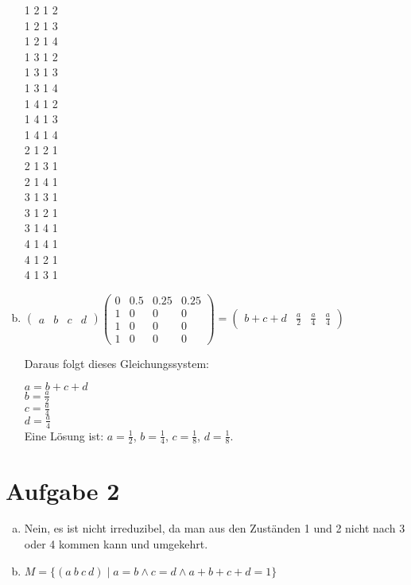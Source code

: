 \documentclass[10pt,a4paper,parskip=half]{scrartcl}
\begin{document}
\begin{enumerate}[a)]
1 2 1 2\\
1 2 1 3\\
1 2 1 4\\
1 3 1 2\\
1 3 1 3\\
1 3 1 4\\
1 4 1 2\\
1 4 1 3\\
1 4 1 4\\
2 1 2 1\\
2 1 3 1\\
2 1 4 1\\
3 1 3 1\\
3 1 2 1\\
3 1 4 1\\
4 1 4 1\\
4 1 2 1\\
4 1 3 1\\
\item
$\begin{pmatrix} a & b & c & d \end{pmatrix}\begin{pmatrix} 0 & 0.5 & 0.25 & 0.25 \\ 1 & 0 & 0 & 0\\ 1 & 0 & 0 & 0\\ 1 & 0 & 0 & 0 \end{pmatrix} = \begin{pmatrix} b + c + d & \frac a 2 & \frac a 4 & \frac a 4 \end{pmatrix}$

Daraus folgt dieses Gleichungssystem:

$a = b + c + d$\\
$b = \frac a 2$\\
$c = \frac a 4$\\
$d = \frac a 4$\\

Eine Lösung ist: $a = \frac 1 2$, $b = \frac 1 4$, $c = \frac 1 8$, $d = \frac 1 8$.
\end{enumerate}
\section*{Aufgabe 2}
\begin{enumerate}[a)]
\item
Nein, es ist nicht irreduzibel, da man aus den Zuständen 1 und 2 nicht nach 3 oder 4 kommen kann und umgekehrt.
\item
$M = \{(a~ b~ c~ d)\mid a = b \land c = d \land a + b + c + d = 1\}$
\end{enumerate}
\end{document}
